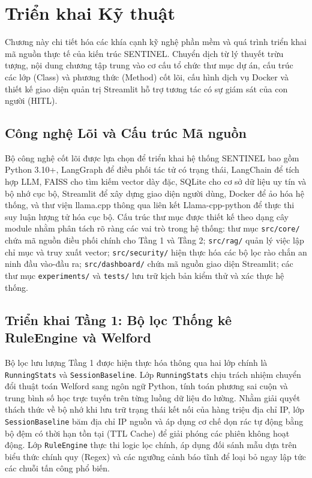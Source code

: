 \chapter{Triển khai Kỹ thuật}
\label{ch:implementation}

Chương này chi tiết hóa các khía cạnh kỹ nghệ phần mềm và quá trình triển khai mã nguồn thực tế của kiến trúc SENTINEL. Chuyển dịch từ lý thuyết trừu tượng, nội dung chương tập trung vào cơ cấu tổ chức thư mục dự án, cấu trúc các lớp (Class) và phương thức (Method) cốt lõi, cấu hình dịch vụ Docker và thiết kế giao diện quản trị Streamlit hỗ trợ tương tác có sự giám sát của con người (HITL).

\section{Công nghệ Lõi và Cấu trúc Mã nguồn}
Bộ công nghệ cốt lõi được lựa chọn để triển khai hệ thống SENTINEL bao gồm Python 3.10+, LangGraph để điều phối tác tử có trạng thái, LangChain để tích hợp LLM, FAISS cho tìm kiếm vector dày đặc, SQLite cho cơ sở dữ liệu uy tín và bộ nhớ cục bộ, Streamlit để xây dựng giao diện người dùng, Docker để ảo hóa hệ thống, và thư viện llama.cpp thông qua liên kết Llama-cpp-python để thực thi suy luận lượng tử hóa cục bộ. Cấu trúc thư mục được thiết kế theo dạng cây module nhằm phân tách rõ ràng các vai trò trong hệ thống: thư mục \texttt{src/core/} chứa mã nguồn điều phối chính cho Tầng 1 và Tầng 2; \texttt{src/rag/} quản lý việc lập chỉ mục và truy xuất vector; \texttt{src/security/} hiện thực hóa các bộ lọc rào chắn an ninh đầu vào-đầu ra; \texttt{src/dashboard/} chứa mã nguồn giao diện Streamlit; các thư mục \texttt{experiments/} và \texttt{tests/} lưu trữ kịch bản kiểm thử và xác thực hệ thống.

\section{Triển khai Tầng 1: Bộ lọc Thống kê RuleEngine và Welford}
Bộ lọc lưu lượng Tầng 1 được hiện thực hóa thông qua hai lớp chính là \texttt{RunningStats} và \texttt{SessionBaseline}. Lớp \texttt{RunningStats} chịu trách nhiệm chuyển đổi thuật toán Welford sang ngôn ngữ Python, tính toán phương sai cuộn và trung bình số học trực tuyến trên từng luồng dữ liệu đo lường. Nhằm giải quyết thách thức về bộ nhớ khi lưu trữ trạng thái kết nối của hàng triệu địa chỉ IP, lớp \texttt{SessionBaseline} băm địa chỉ IP nguồn và áp dụng cơ chế dọn rác tự động bằng bộ đệm có thời hạn tồn tại (TTL Cache) để giải phóng các phiên không hoạt động. Lớp \texttt{RuleEngine} thực thi logic lọc chính, áp dụng đối sánh mẫu dựa trên biểu thức chính quy (Regex) và các ngưỡng cảnh báo tĩnh để loại bỏ ngay lập tức các chuỗi tấn công phổ biến.

